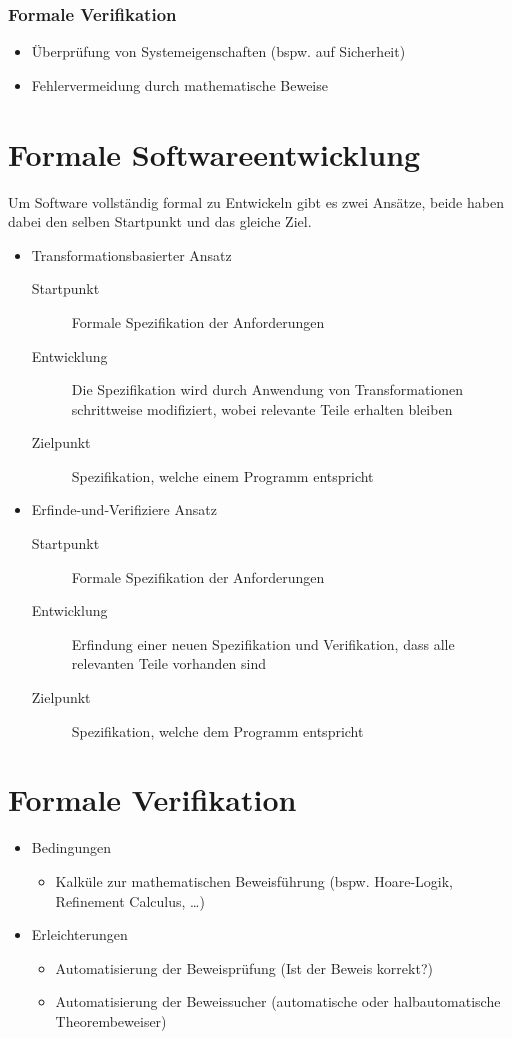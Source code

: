 			\subsubsection{Formale Verifikation}
				\begin{itemize}
					\item Überprüfung von Systemeigenschaften (bspw. auf Sicherheit)
					\item Fehlervermeidung durch mathematische Beweise
				\end{itemize}

	\section{Formale Softwareentwicklung}
		Um Software vollständig formal zu Entwickeln gibt es zwei Ansätze, beide haben dabei den selben Startpunkt und das gleiche Ziel.
		\begin{itemize}
			\item Transformationsbasierter Ansatz
				\begin{description}
					\item[Startpunkt] Formale Spezifikation der Anforderungen
					\item[Entwicklung] Die Spezifikation wird durch Anwendung von Transformationen schrittweise modifiziert, wobei relevante Teile erhalten bleiben
					\item[Zielpunkt] Spezifikation, welche einem Programm entspricht
				\end{description}
			\item Erfinde-und-Verifiziere Ansatz
				\begin{description}
					\item[Startpunkt] Formale Spezifikation der Anforderungen
					\item[Entwicklung] Erfindung einer neuen Spezifikation und Verifikation, dass alle relevanten Teile vorhanden sind
					\item[Zielpunkt] Spezifikation, welche dem Programm entspricht
				\end{description}
		\end{itemize}

	\section{Formale Verifikation}
		\begin{itemize}
			\item Bedingungen
				\begin{itemize}
					\item Kalküle zur mathematischen Beweisführung (bspw. Hoare-Logik, Refinement Calculus, \dots)
				\end{itemize}
			\item Erleichterungen
				\begin{itemize}
					\item Automatisierung der Beweisprüfung (Ist der Beweis korrekt?)
					\item Automatisierung der Beweissucher (automatische oder halbautomatische Theorembeweiser)
				\end{itemize}
		\end{itemize}

